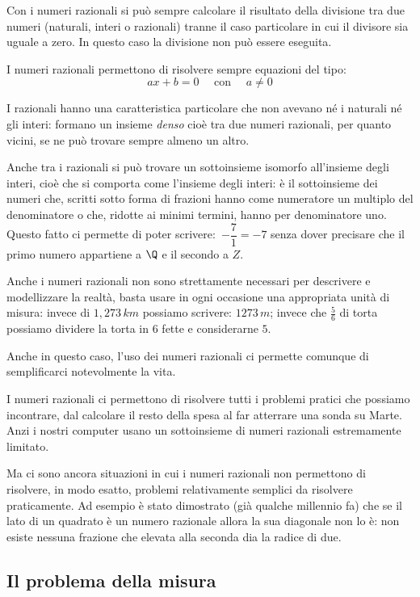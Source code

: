 Con i numeri razionali si può sempre calcolare il risultato della divisione 
tra due numeri (naturali, interi o razionali) tranne il caso particolare in 
cui il divisore sia uguale a zero. 
In questo caso la divisione non può essere eseguita.

I numeri razionali permettono di risolvere sempre equazioni del tipo:
\[ax+b=0 \quad \text{ con } \quad a \neq 0\]

I razionali hanno una caratteristica particolare che non avevano né i 
naturali né gli interi: formano un insieme \emph{denso} cioè tra due numeri 
razionali, per quanto vicini, se ne può trovare sempre almeno un altro.

Anche tra i razionali si può trovare un sottoinsieme isomorfo all'insieme 
degli interi, cioè che si comporta come l'insieme degli interi: è il 
sottoinsieme dei numeri che, scritti sotto forma di frazioni hanno come 
numeratore un multiplo del denominatore o che, ridotte ai minimi termini, 
hanno per denominatore uno. 
Questo fatto ci permette di poter scrivere:~\(-\dfrac{7}{1} = -7\) 
senza dover precisare che il primo numero appartiene a \(\Q\) e il secondo 
a \(Z\).

Anche i numeri razionali non sono strettamente necessari per descrivere e 
modellizzare la realtà, basta usare in ogni occasione una appropriata unità 
di misura: invece di \(1,273\,km\) possiamo scrivere: \(1273\,m\); 
invece che \(\frac{5}{6}\) di torta possiamo dividere la torta in \(6\) fette
e considerarne \(5\).

Anche in questo caso, l'uso dei numeri razionali ci permette comunque di 
semplificarci notevolmente la vita.

I numeri razionali ci permettono di risolvere tutti i problemi pratici che 
possiamo incontrare, dal calcolare il resto della spesa al far atterrare una 
sonda su Marte. 
Anzi i nostri computer usano un sottoinsieme di numeri razionali estremamente 
limitato.

Ma ci sono ancora situazioni in cui i numeri razionali non permettono di 
risolvere, in modo esatto, problemi relativamente semplici da risolvere 
praticamente. 
Ad esempio è stato dimostrato (già qualche millennio fa) che se il lato di 
un quadrato è un numero razionale allora la sua diagonale non lo è:
non esiste nessuna frazione che elevata alla seconda dia la radice di due.

\subsection{Il problema della misura}

